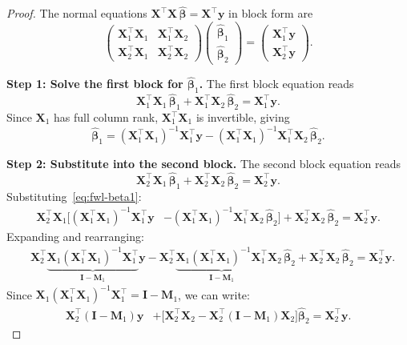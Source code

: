 \documentclass[11pt,a4paper]{article}
\theoremstyle{plain}
\theoremstyle{definition}
\newcommand{\bhat}{\hat{\bm{\beta}}}
\newcommand{\bX}{\bm{X}}
\newcommand{\by}{\bm{y}}
\newcommand{\bM}{\bm{M}}
\newcommand{\bI}{\bm{I}}
\begin{document}
\begin{proof}
The normal equations $\bX^\top\bX\,\bhat = \bX^\top\by$ in block form are
\begin{equation}\label{eq:fwl-blocks}
  \begin{pmatrix}
    \bX_1^\top\bX_1 & \bX_1^\top\bX_2 \\
    \bX_2^\top\bX_1 & \bX_2^\top\bX_2
  \end{pmatrix}
  \begin{pmatrix}\bhat_1 \\ \bhat_2\end{pmatrix}
  =
  \begin{pmatrix}\bX_1^\top\by \\ \bX_2^\top\by\end{pmatrix}.
\end{equation}

\noindent\textbf{Step 1: Solve the first block for $\bhat_1$.}
The first block equation reads
\[
  \bX_1^\top\bX_1\,\bhat_1 + \bX_1^\top\bX_2\,\bhat_2
  = \bX_1^\top\by.
\]
Since $\bX_1$ has full column rank, $\bX_1^\top\bX_1$ is invertible, giving
\begin{equation}\label{eq:fwl-beta1}
  \bhat_1
  = (\bX_1^\top\bX_1)^{-1}\bX_1^\top\by
    - (\bX_1^\top\bX_1)^{-1}\bX_1^\top\bX_2\,\bhat_2.
\end{equation}

\noindent\textbf{Step 2: Substitute into the second block.}
The second block equation reads
\[
  \bX_2^\top\bX_1\,\bhat_1 + \bX_2^\top\bX_2\,\bhat_2
  = \bX_2^\top\by.
\]
Substituting~\eqref{eq:fwl-beta1}:
\begin{align*}
  \bX_2^\top\bX_1
  \bigl[(\bX_1^\top\bX_1)^{-1}\bX_1^\top\by
        &- (\bX_1^\top\bX_1)^{-1}\bX_1^\top\bX_2\,\bhat_2\bigr]
  + \bX_2^\top\bX_2\,\bhat_2
  = \bX_2^\top\by.
\end{align*}
Expanding and rearranging:
\begin{align*}
  &\bX_2^\top\underbrace{\bX_1(\bX_1^\top\bX_1)^{-1}\bX_1^\top}_{\bI - \bM_1}\by
  - \bX_2^\top\underbrace{\bX_1(\bX_1^\top\bX_1)^{-1}\bX_1^\top}_{\bI - \bM_1}\bX_2\,\bhat_2
  + \bX_2^\top\bX_2\,\bhat_2
  = \bX_2^\top\by.
\end{align*}
Since $\bX_1(\bX_1^\top\bX_1)^{-1}\bX_1^\top = \bI - \bM_1$, we can write:
\begin{align*}
  \bX_2^\top(\bI - \bM_1)\by
  &+ \bigl[\bX_2^\top\bX_2
     - \bX_2^\top(\bI - \bM_1)\bX_2\bigr]\bhat_2
  = \bX_2^\top\by.
\end{align*}


\end{proof}
\end{document}
